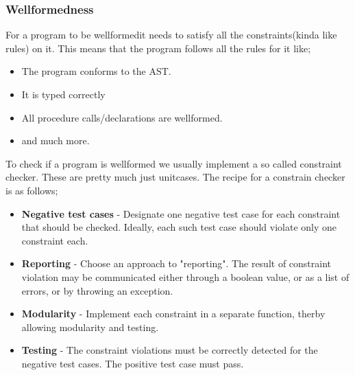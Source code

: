 \documentclass{article}
\begin{document}
            \subsubsection{Wellformedness}
                For a program to be \gls{wellformed}it needs to satisfy all the constraints(kinda like rules) on it. This means that the program follows all the rules 
                for it like; 
                \begin{itemize}
                    \item The program conforms to the AST.
                    \item It is typed correctly
                    \item All procedure calls/declarations are wellformed.
                    \item and much more.
                \end{itemize}
                To check if a program is wellformed we usually implement a so called constraint checker. These are pretty much just unitcases.
                The recipe for a constrain checker is as follows;
                \begin{itemize}
                    \item \textbf{Negative test cases} - Designate one negative test case for each constraint that should be checked. 
                    Ideally, each such test case should violate only one constraint each.
                    \item \textbf{Reporting} - Choose an approach to "reporting". The result of constraint violation may be communicated either through
                                            a boolean value, or as a list of errors, or by throwing an exception.
                    \item \textbf{Modularity} - Implement each constraint in a separate function, therby allowing modularity and testing.
                    \item \textbf{Testing} - The constraint violations must be correctly detected for the negative test cases. The positive test case must pass.
                \end{itemize}
\end{document}
